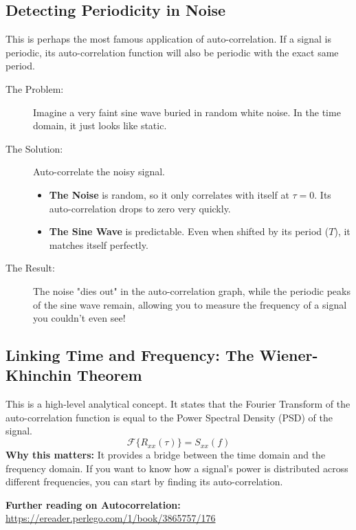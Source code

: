 \documentclass[12pt,a4paper]{article}
\begin{document}
\subsection*{Detecting Periodicity in Noise}
This is perhaps the most famous application of auto-correlation. If a signal is periodic, its auto-correlation function will also be periodic with the exact same period.
\begin{description}
    \item[The Problem:] Imagine a very faint sine wave buried in random white noise. In the time domain, it just looks like static.
    \item[The Solution:] Auto-correlate the noisy signal.
    \begin{itemize}
        \item \textbf{The Noise} is random, so it only correlates with itself at \(\tau=0\). Its auto-correlation drops to zero very quickly.
        \item \textbf{The Sine Wave} is predictable. Even when shifted by its period (\(T\)), it matches itself perfectly.
    \end{itemize}
    \item[The Result:] The noise "dies out" in the auto-correlation graph, while the periodic peaks of the sine wave remain, allowing you to measure the frequency of a signal you couldn't even see!
\end{description}

\subsection*{Linking Time and Frequency: The Wiener-Khinchin Theorem}
This is a high-level analytical concept. It states that the Fourier Transform of the auto-correlation function is equal to the Power Spectral Density (PSD) of the signal.
\[ \mathcal{F}\{R_{xx}(\tau)\} = S_{xx}(f) \]
\textbf{Why this matters:} It provides a bridge between the time domain and the frequency domain. If you want to know how a signal's power is distributed across different frequencies, you can start by finding its auto-correlation.

\textbf{Further reading on Autocorrelation:} \url{https://ereader.perlego.com/1/book/3865757/176}
\end{document}
